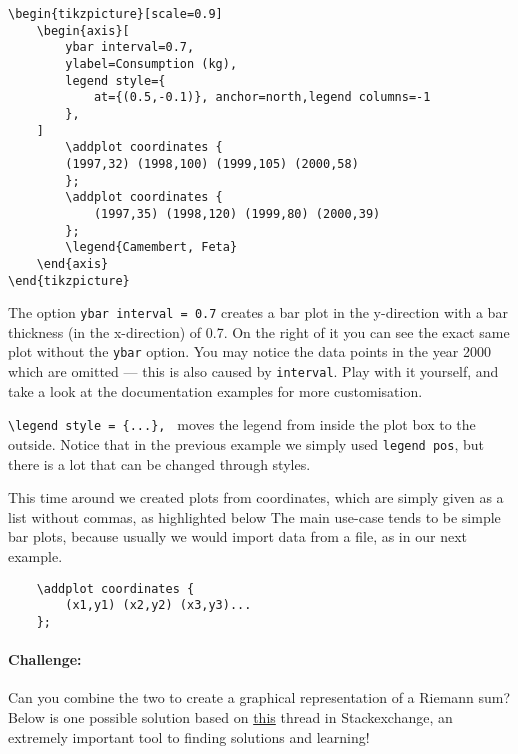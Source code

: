 \begin{lstlisting}
\begin{tikzpicture}[scale=0.9]
    \begin{axis}[
        ybar interval=0.7,
        ylabel=Consumption (kg),
        legend style={
            at={(0.5,-0.1)}, anchor=north,legend columns=-1
        },
    ]
        \addplot coordinates {
        (1997,32) (1998,100) (1999,105) (2000,58) 
        };
        \addplot coordinates {
            (1997,35) (1998,120) (1999,80) (2000,39) 
        };
        \legend{Camembert, Feta}
    \end{axis}
\end{tikzpicture}
\end{lstlisting}
The option \verb|ybar interval = 0.7| creates a bar plot in the y-direction with a bar thickness (in the x-direction) of 0.7.
On the right of it you can see the exact same plot without the \verb|ybar| option.
You may notice the data points in the year 2000 which are omitted --- this is also caused by \verb|interval|.
Play with it yourself, and take a look at the documentation examples for more customisation.

\verb|\legend style = {...}, | moves the legend from inside the plot box to the outside.
Notice that in the previous example we simply used \verb|legend pos|, but there is a lot that can be changed through styles.

This time around we created plots from coordinates, which are simply given as a list without commas, as highlighted below
The main use-case tends to be simple bar plots, because usually we would import data from a file, as in our next example.

\begin{lstlisting}
    \addplot coordinates {
        (x1,y1) (x2,y2) (x3,y3)...
    };
\end{lstlisting}

\paragraph{Challenge:}
Can you combine the two to create a graphical representation of a Riemann sum?
Below is one possible solution based on \href{https://tex.stackexchange.com/questions/197930/riemann-sum-with-pgfplots-cant-seem-to-make-graph-look-right}{this} thread in Stackexchange, an extremely important tool to finding solutions and learning!

